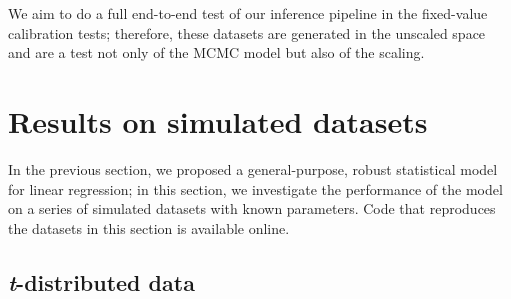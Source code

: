 \documentclass[fleqn,usenatbib]{mnras}
\begin{document}
We aim to do a full end-to-end test of our inference pipeline in the fixed-value
calibration tests; therefore, these datasets are generated in the unscaled space
and are a test not only of the MCMC model but also of the scaling.









\section{Results on simulated datasets}
\label{sec:results}

In the previous section, we proposed a general-purpose, robust statistical model
for linear regression; in this section, we investigate the performance of the
model on a series of simulated datasets with known parameters. Code that
reproduces the datasets in this section is available online\footnotemark.


\subsection{\textit{t}-distributed data}
\label{sec:results.t}
\end{document}
